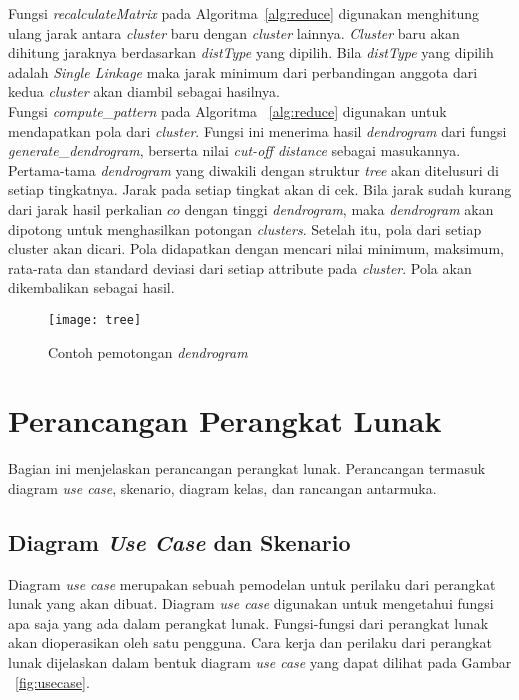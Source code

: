 Fungsi \textit{recalculateMatrix} pada Algoritma~\ref{alg:reduce} digunakan menghitung ulang jarak antara \textit{cluster} baru dengan \textit{cluster} lainnya. \textit{Cluster} baru akan dihitung jaraknya berdasarkan \textit{distType} yang dipilih. Bila \textit{distType} yang dipilih adalah \textit{Single Linkage} maka jarak minimum dari perbandingan anggota dari kedua \textit{cluster} akan diambil sebagai hasilnya.\\

Fungsi \textit{compute}\_\textit{pattern} pada Algoritma ~\ref{alg:reduce} digunakan untuk mendapatkan pola dari \textit{cluster}. Fungsi ini menerima hasil \textit{dendrogram} dari fungsi \textit{generate}\_\textit{dendrogram}, berserta nilai \textit{cut-off distance} sebagai masukannya. Pertama-tama \textit{dendrogram} yang diwakili dengan struktur \textit{tree} akan ditelusuri di setiap tingkatnya. Jarak pada setiap tingkat akan di cek. Bila jarak sudah kurang dari jarak hasil perkalian $co$ dengan tinggi \textit{dendrogram}, maka \textit{dendrogram} akan dipotong untuk menghasilkan potongan \textit{clusters}. Setelah itu, pola dari setiap cluster akan dicari. Pola didapatkan dengan mencari nilai minimum, maksimum, rata-rata dan standard deviasi dari setiap attribute pada \textit{cluster}. Pola akan dikembalikan sebagai hasil.

\begin{figure}[H]
    \centering  
    \texttt{[image: tree]}  
    \caption[Contoh pemotongan \textit{dendrogram}]{Contoh pemotongan \textit{dendrogram}} 
    \label{fig:tree} 
\end{figure}


 

\section{Perancangan Perangkat Lunak}

Bagian ini menjelaskan perancangan perangkat lunak.  Perancangan termasuk diagram \textit{use case}, skenario, diagram kelas, dan rancangan antarmuka. 


\subsection{Diagram \textit{Use Case} dan Skenario}

Diagram \textit{use case} merupakan sebuah pemodelan untuk perilaku dari perangkat lunak yang akan dibuat. Diagram \textit{use case} digunakan untuk mengetahui fungsi apa saja yang ada dalam perangkat lunak. Fungsi-fungsi dari perangkat lunak akan dioperasikan oleh satu pengguna. Cara kerja dan perilaku dari perangkat lunak dijelaskan dalam bentuk diagram \textit{use case} yang dapat dilihat pada Gambar ~\ref{fig:usecase}.


